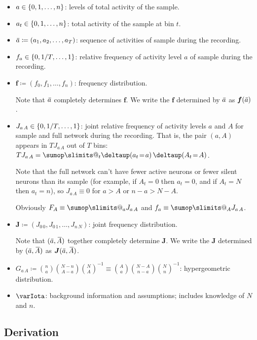 \documentclass[\ifafour a4paper,12pt,\else a5paper,10pt,\fi%
onecolumn,oneside,article,%
british%
]{memoir}
\makeatletter
\theoremstyle{remark}
\theoremstyle{innote}
\def\sum{\DOTSI\sumop\slimits@}
\newcommand*{\delt}{\deltaup}%
\newcommand*{\defd}{\coloneqq}
\DeclarePairedDelimiter\set{\{}{\}}
\renewcommand*{\|}[1][]{\nonscript\,#1\vert\nonscript\;\mathopen{}}
\newcommand*{\widebar}[1]{{\mkern1.5mu\skew{2}\overline{\mkern-1.5mu#1\mkern-1.5mu}\mkern 1.5mu}}
\newcommand*{\yff}{f}
\newcommand*{\yf}{\bm{\yff}}
\newcommand*{\yAs}{\widebar{A}}%
\newcommand*{\yas}{\widebar{a}}%
\newcommand*{\yeq}{\mathrel{\!=\!}}
\newcommand*{\yJJ}{J}
\newcommand*{\yJ}{\bm{\yJJ}}
\newcommand*{\yI}{\varIota}
\makeatother
\begin{document}
\begin{itemize}[wide,label={}]
\item $a\in\set{0,1,\dotsc,n}$: levels of total activity of the sample.

\item $a_{t}\in\set{0,1,\dotsc,n}$: total activity of the sample at bin $t$.

\item $\yas \defd (a_{1}, a_{2}, \dotsc, a_{T})$: sequence of activities of
sample during the recording.

\item $f_{a} \in \set{0,1/T,\dotsc,1}$: relative frequency of activity level $a$
of sample during the recording.

\item $\yf \defd (f_{0},f_{1}, \dotsc,f_{n})$: frequency distribution.

  Note that $\yas$ completely determines $\yf$.  We write the $\yf$
  determined by $\yas$ as $\yf(\yas)$.

  
\item $J_{a\,A} \in \set{0,1/T,\dotsc,1}$: joint relative frequency of
  activity levels $a$ and $A$ for sample and full network during the
  recording. That is, the pair $(a,A)$ appears in $T J_{a\,A}$ out of $T$
  bins:
  $T J_{a\,A} = \sum_{t}\delt(a_{t} \yeq  a)\, \delt(A_{t}
  \yeq  A)$.

  Note that the full network can't have fewer active neurons or fewer
  silent neurons than its sample (for example, if $A_{t}=0$ then
  $a_{t}=0$, and if $A_{t}=N$ then $a_{t}=n$), so $J_{a\,A}\equiv 0$ for
  $a>A$ or $n-a>N-A$.

  Obviously $F_{A}\equiv\sum_{a}J_{a\,A}$ and $f_{a}\equiv\sum_{A}J_{a\,A}$.

\item $\yJ \defd (J_{0\,0},J_{0\,1}, \dotsc,J_{n\,N})$: joint frequency
  distribution.

  Note that $(\yas,\yAs)$ together completely determine $\yJ$.  We write the $\yJ$
  determined by $(\yas,\yAs)$ as $\yJ(\yas,\yAs)$.

\item
  $G_{a\,A} \defd 
  \binom{n}{a}\binom{N-n}{A-a}\binom{N}{A}^{-1} \equiv
  \binom{A}{a}\binom{N-A}{n-a}\binom{N}{n}^{-1}$: hypergeometric
  distribution.
  
\item $\yI$: background information and assumptions; includes knowledge of
  $N$ and $n$.
\end{itemize}

\subsection{Derivation}
\label{sec:derivation_steps}
\end{document}
